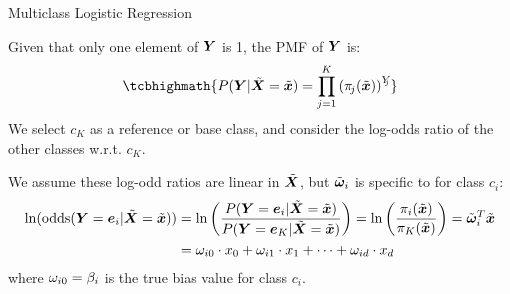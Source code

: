 \begin{frame}{Multiclass Logistic Regression}

Given that only one element of ${\boldsymbol Y}$ is 1, the PMF of ${\boldsymbol Y}$ is:
\begin{align*}
    \tcbhighmath{
    P(\bY|\abX=\abx) = \prod_{j=1}^{K} \lB(\pi_{\!j}(\abx)
    \rB)^{Y_{\!\!j}}
}
\end{align*}
%
We select %
$c_K$ as a reference or base class, and consider the log-odds ratio of
the
other classes w.r.t. $c_K$. 

	\medskip

We assume these log-odd
ratios are linear in $\tilde{{\boldsymbol X}}$, but 
$\tilde{{\bm \omega}}_i$ is specific to
for class $c_i$:
\begin{align*}
    \ln(\operatorname{odds}({\boldsymbol Y}={\boldsymbol e}_i|\tilde{{\boldsymbol X}}=\tilde{{\boldsymbol x}})) & = \ln\left(
    \frac{P({\boldsymbol Y}={\boldsymbol e}_i|\tilde{{\boldsymbol X}}=\tilde{{\boldsymbol x}})}{P({\boldsymbol Y}={\boldsymbol e}_K|\tilde{{\boldsymbol X}}=\tilde{{\boldsymbol x}})} \right) = 
    \ln\left( \frac{\pi_i(\tilde{{\boldsymbol x}})}{\pi_K(\tilde{{\boldsymbol x}})} \right) =
    \tilde{{\bm \omega}}_i^T\tilde{{\boldsymbol x}}\notag\\
    & = \omega_{i0} \cdot x_0 + \omega_{i1} \cdot x_1 + \cdots +
    \omega_{id} \cdot x_d
\end{align*}
where $\omega_{i0} = \beta_i$ is the true bias value for class $c_i$.
%

\end{frame}

